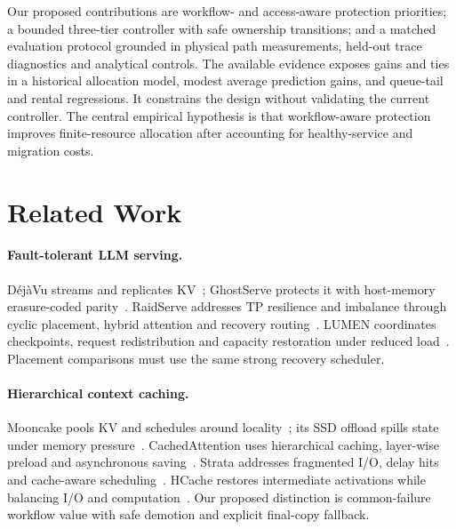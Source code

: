 \documentclass[sigplan,10pt,anonymous,nonacm]{acmart}
\begin{document}
Our proposed contributions are workflow- and access-aware protection
priorities; a bounded three-tier controller with safe ownership
transitions; and a matched evaluation protocol grounded in physical
path measurements, held-out trace diagnostics and analytical controls.
The available evidence exposes gains and ties in a historical allocation
model, modest average prediction gains, and queue-tail and rental
regressions. It constrains the design without validating the current
controller. The central empirical hypothesis is that workflow-aware
protection improves finite-resource allocation after accounting for
healthy-service and migration costs.







\section{Related Work}
\label{sec:related}

\paragraph{Fault-tolerant LLM serving.}
D\'ej\`aVu streams and replicates KV~\cite{strati2024dejavu}; GhostServe
protects it with host-memory erasure-coded parity~\cite{jayakody2026ghostserve}.
RaidServe addresses TP resilience and imbalance through cyclic placement,
hybrid attention and recovery routing~\cite{xu2026raidserve}. LUMEN
coordinates checkpoints, request redistribution and capacity restoration
under reduced load~\cite{cao2026lumen}. Placement comparisons must use the same strong recovery scheduler.

\paragraph{Hierarchical context caching.}
Mooncake pools KV and schedules around locality~\cite{qin2025mooncake};
its SSD offload spills state under memory pressure~\cite{mooncake2026ssdoffload}.
CachedAttention uses hierarchical caching, layer-wise preload and
asynchronous saving~\cite{gao2024cachedattention}. Strata addresses
fragmented I/O, delay hits and cache-aware scheduling~\cite{xie2026strata}.
HCache restores intermediate activations while balancing I/O and
computation~\cite{gao2025hcache}. Our proposed distinction is common-failure workflow value
with safe demotion and explicit final-copy fallback.
\end{document}
